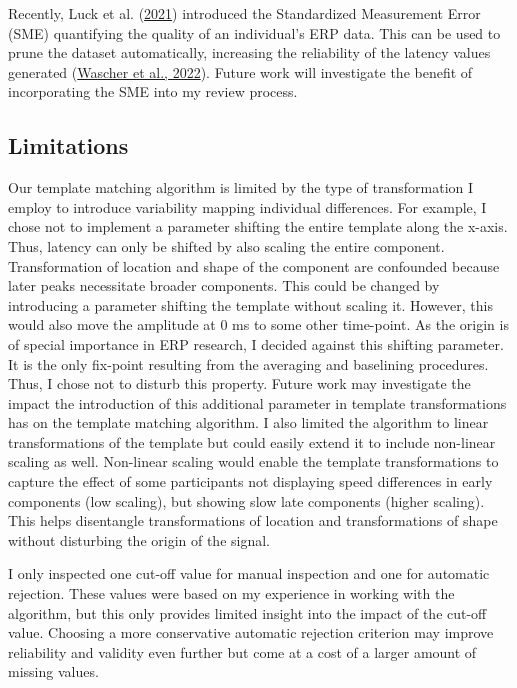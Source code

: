 \documentclass[
  man]{apa7}
\begin{document}
Recently, Luck et al. (\protect\hyperlink{ref-luck2021standardized}{2021}) introduced the Standardized Measurement Error (SME) quantifying the quality of an individual's ERP data. This can be used to prune the dataset automatically, increasing the reliability of the latency values generated (\protect\hyperlink{ref-wascher2022mental}{Wascher et al., 2022}). Future work will investigate the benefit of incorporating the SME into my review process.

\hypertarget{limitations}{%
\subsection{Limitations}\label{limitations}}

Our template matching algorithm is limited by the type of transformation I employ to introduce variability mapping individual differences. For example, I chose not to implement a parameter shifting the entire template along the x-axis. Thus, latency can only be shifted by also scaling the entire component. Transformation of location and shape of the component are confounded because later peaks necessitate broader components. This could be changed by introducing a parameter shifting the template without scaling it. However, this would also move the amplitude at 0 ms to some other time-point. As the origin is of special importance in ERP research, I decided against this shifting parameter. It is the only fix-point resulting from the averaging and baselining procedures. Thus, I chose not to disturb this property. Future work may investigate the impact the introduction of this additional parameter in template transformations has on the template matching algorithm. I also limited the algorithm to linear transformations of the template but could easily extend it to include non-linear scaling as well. Non-linear scaling would enable the template transformations to capture the effect of some participants not displaying speed differences in early components (low scaling), but showing slow late components (higher scaling). This helps disentangle transformations of location and transformations of shape without disturbing the origin of the signal.

I only inspected one cut-off value for manual inspection and one for automatic rejection. These values were based on my experience in working with the algorithm, but this only provides limited insight into the impact of the cut-off value. Choosing a more conservative automatic rejection criterion may improve reliability and validity even further but come at a cost of a larger amount of missing values.
\end{document}
